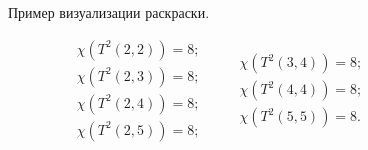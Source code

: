 \begin{figure}[h]
\centering
\captionsetup{justification=centering}
\begin{minipage}[b]{0.5\linewidth}
\end{minipage}\hfill
\begin{minipage}[b]{0.5\linewidth}
\end{minipage}\hfill
\begin{minipage}[b]{0.5\linewidth}
\end{minipage}\hfill
\begin{minipage}[b]{0.5\linewidth}
\end{minipage}\hfill
\caption{Пример визуализации раскраски.}
\label{chapter3:fig:viz}
\end{figure}

\begin{statement}
\begin{equation}
\begin{split}
\chi(T^{2}(2,2)) = 8; \\
\chi(T^{2}(2,3)) = 8; \\
\chi(T^{2}(2,4)) = 8; \\
\chi(T^{2}(2,5)) = 8; \\
\end{split}
\quad\quad
\begin{split}
\chi(T^{2}(3,4)) = 8; \\
\chi(T^{2}(4,4)) = 8; \\
\chi(T^{2}(5,5)) = 8. \\
\end{split}
\end{equation}
\end{statement}

